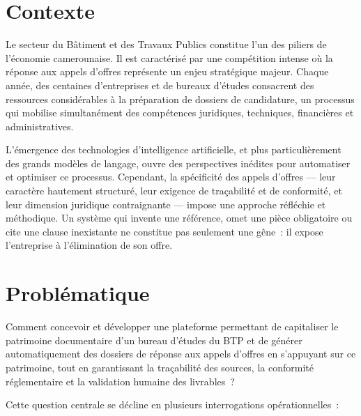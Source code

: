 
\section*{Contexte}

Le secteur du Bâtiment et des Travaux Publics constitue l'un des piliers de
l'économie camerounaise. Il est caractérisé par une compétition intense où la
réponse aux appels d'offres représente un enjeu stratégique majeur. Chaque
année, des centaines d'entreprises et de bureaux d'études consacrent des
ressources considérables à la préparation de dossiers de candidature, un
processus qui mobilise simultanément des compétences juridiques, techniques,
financières et administratives.

L'émergence des technologies d'intelligence artificielle, et plus
particulièrement des grands modèles de langage, ouvre des perspectives inédites
pour automatiser et optimiser ce processus. Cependant, la spécificité des
appels d'offres — leur caractère hautement structuré, leur exigence de
traçabilité et de conformité, et leur dimension juridique contraignante —
impose une approche réfléchie et méthodique. Un système qui invente une
référence, omet une pièce obligatoire ou cite une clause inexistante ne
constitue pas seulement une gêne~: il expose l'entreprise à l'élimination de
son offre.

\section*{Problématique}

\begin{btpquote}
Comment concevoir et développer une plateforme permettant de capitaliser le
patrimoine documentaire d'un bureau d'études du BTP et de générer
automatiquement des dossiers de réponse aux appels d'offres en s'appuyant sur
ce patrimoine, tout en garantissant la traçabilité des sources, la conformité
réglementaire et la validation humaine des livrables~?
\end{btpquote}

Cette question centrale se décline en plusieurs interrogations
opérationnelles~:

